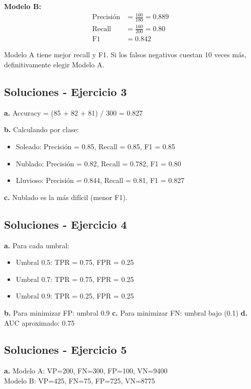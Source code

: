 \documentclass[12pt]{article}
\begin{document}
\textbf{Modelo B:}
\begin{align*}
\text{Precisión} &= \frac{160}{180} = 0.889 \\
\text{Recall} &= \frac{160}{200} = 0.80 \\
\text{F1} &= 0.842
\end{align*}

Modelo A tiene mejor recall y F1. Si los falsos negativos cuestan 10 veces más, definitivamente elegir Modelo A.

\subsection{Soluciones - Ejercicio 3}

\textbf{a.} Accuracy = (85 + 82 + 81) / 300 = 0.827

\textbf{b.} Calculando por clase:
\begin{itemize}
    \item Soleado: Precisión = 0.85, Recall = 0.85, F1 = 0.85
    \item Nublado: Precisión = 0.82, Recall = 0.782, F1 = 0.80
    \item Lluvioso: Precisión = 0.844, Recall = 0.81, F1 = 0.827
\end{itemize}

\textbf{c.} Nublado es la más difícil (menor F1).

\subsection{Soluciones - Ejercicio 4}

\textbf{a.} Para cada umbral:
\begin{itemize}
    \item Umbral 0.5: TPR = 0.75, FPR = 0.25
    \item Umbral 0.7: TPR = 0.75, FPR = 0.25
    \item Umbral 0.9: TPR = 0.25, FPR = 0.25
\end{itemize}

\textbf{b.} Para minimizar FP: umbral 0.9
\textbf{c.} Para minimizar FN: umbral bajo (0.1)
\textbf{d.} AUC aproximado: 0.75

\subsection{Soluciones - Ejercicio 5}

\textbf{a.} Modelo A: VP=200, FN=300, FP=100, VN=9400 \\
Modelo B: VP=425, FN=75, FP=725, VN=8775
\end{document}

